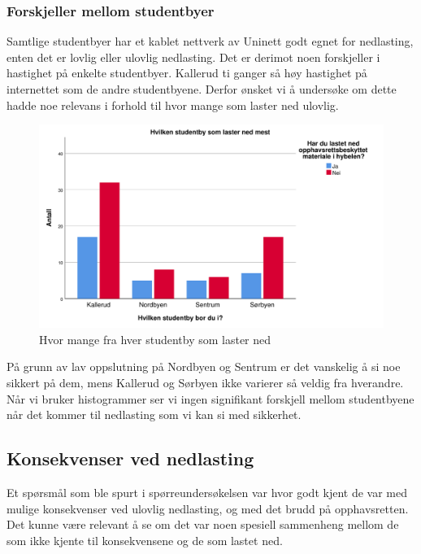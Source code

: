 \subsubsection{Forskjeller mellom studentbyer}
Samtlige studentbyer har et kablet nettverk av Uninett godt egnet for nedlasting, enten det er lovlig eller ulovlig nedlasting. Det er derimot noen forskjeller i hastighet på enkelte studentbyer. Kallerud ti ganger så høy hastighet på internettet som de andre studentbyene. Derfor ønsket vi å undersøke om dette hadde noe relevans i forhold til hvor mange som laster ned ulovlig. 

\begin{figure}[H]
    \centering
    \includegraphics[scale=0.45]{case_1/bilder/studentby_lasterned.pdf}
    \caption[Studentby laster ned]{Hvor mange fra hver studentby som laster ned}
    \label{fig:case1-studentby_lasterned}
\end{figure}

På grunn av lav oppslutning på Nordbyen og Sentrum er det vanskelig å si noe sikkert på dem, mens Kallerud og Sørbyen ikke varierer så veldig fra hverandre. Når vi bruker histogrammer ser vi ingen signifikant forskjell mellom studentbyene når det kommer til nedlasting som vi kan si med sikkerhet.


\subsection{Konsekvenser ved nedlasting}
Et spørsmål som ble spurt i spørreundersøkelsen var hvor godt kjent de var med mulige konsekvenser ved ulovlig nedlasting, og med det brudd på opphavsretten. Det kunne være relevant å se om det var noen spesiell sammenheng mellom de som ikke kjente til konsekvensene og de som lastet ned. 

